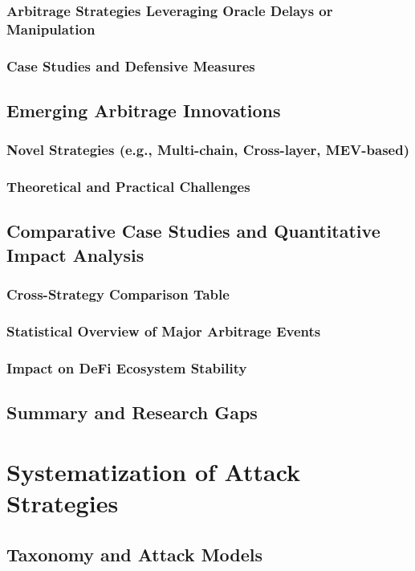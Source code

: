 \documentclass[conference]{IEEEtran}
\begin{document}
    \subsubsection{Arbitrage Strategies Leveraging Oracle Delays or Manipulation}
    \subsubsection{Case Studies and Defensive Measures}
\subsection{Emerging Arbitrage Innovations}
    \subsubsection{Novel Strategies (e.g., Multi-chain, Cross-layer, MEV-based)}
    \subsubsection{Theoretical and Practical Challenges}
\subsection{Comparative Case Studies and Quantitative Impact Analysis}
    \subsubsection{Cross-Strategy Comparison Table}
    \subsubsection{Statistical Overview of Major Arbitrage Events}
    \subsubsection{Impact on DeFi Ecosystem Stability}
\subsection{Summary and Research Gaps}

\section{Systematization of Attack Strategies}
\subsection{Taxonomy and Attack Models}
\end{document}
